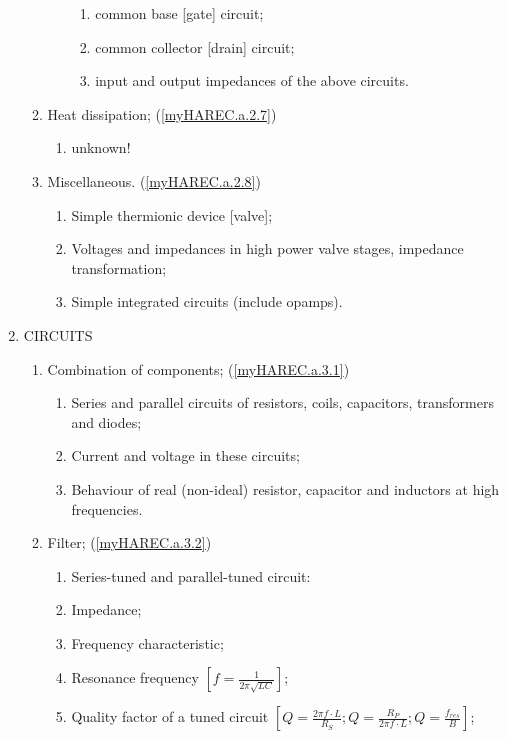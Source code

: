 \begin{enumerate}
\begin{enumerate}[noitemsep]
\begin{enumerate}[noitemsep]
\begin{enumerate}[noitemsep]
	\item common base [gate] circuit;
	\item common collector [drain] circuit;
	\item input and output impedances of the above circuits.
\end{enumerate}
\end{enumerate}
\item Heat dissipation; (\ref{myHAREC.a.2.7})\label{HAREC.a.2.7}
\begin{enumerate}[noitemsep]
\item unknown! 
\end{enumerate}
\item Miscellaneous. (\ref{myHAREC.a.2.8})\label{HAREC.a.2.8}
\begin{enumerate}[noitemsep]
\item Simple thermionic device [valve];
\item Voltages and impedances in high power valve stages, impedance transformation;
\item Simple integrated circuits (include opamps).
\end{enumerate}
\end{enumerate}
\item CIRCUITS
\begin{enumerate}[noitemsep]
\item Combination of components; (\ref{myHAREC.a.3.1})\label{HAREC.a.3.1}
\begin{enumerate}[noitemsep]
\item Series and parallel circuits of resistors, coils, capacitors, transformers and diodes;
\item Current and voltage in these circuits;
\item Behaviour of real (non-ideal) resistor, capacitor and inductors at high frequencies.
\end{enumerate}
\item Filter; (\ref{myHAREC.a.3.2})\label{HAREC.a.3.2}
\begin{enumerate}[noitemsep]
\item Series-tuned and parallel-tuned circuit: 
\item Impedance;
\item Frequency characteristic; 
\item Resonance frequency $\left[f=\frac{1}{2\pi\sqrt{LC}}\right]$;
\item Quality factor of a tuned circuit $\left[Q=\frac{2\pi f \cdot L}{R_S}; Q=\frac{R_P}{2\pi f \cdot L};Q=\frac{f_{res}}{B}\right]$;

\end{enumerate}
\end{enumerate}
\end{enumerate}
